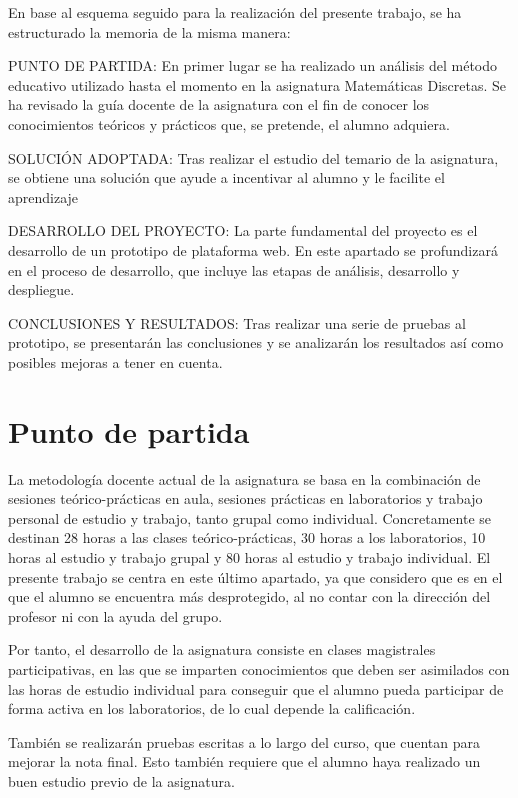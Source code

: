 \documentclass[openright,twoside,10pt]{book}
\begin{document}
    En base al esquema seguido para la realización del presente trabajo, se
    ha estructurado la memoria de la misma manera:
    
    PUNTO DE PARTIDA: En primer lugar se ha realizado un análisis del método
    educativo utilizado hasta el momento en la asignatura Matemáticas
    Discretas. Se ha revisado la guía docente de la asignatura con el fin de
    conocer los conocimientos teóricos y prácticos que, se pretende, el
    alumno adquiera.
    
    SOLUCIÓN ADOPTADA: Tras realizar el estudio del temario de la
    asignatura, se obtiene una solución que ayude a incentivar al alumno y
    le facilite el aprendizaje
    
    DESARROLLO DEL PROYECTO: La parte fundamental del proyecto es el
    desarrollo de un prototipo de plataforma web. En este apartado se
    profundizará en el proceso de desarrollo, que incluye las etapas de
    análisis, desarrollo y despliegue.
    
    CONCLUSIONES Y RESULTADOS: Tras realizar una serie de pruebas al
    prototipo, se presentarán las conclusiones y se analizarán los
    resultados así como posibles mejoras a tener en cuenta.
    
    \chapter{Punto de partida}\label{punto-de-partida}
    
    La metodología docente actual de la asignatura se basa en la combinación
    de sesiones teórico-prácticas en aula, sesiones prácticas en
    laboratorios y trabajo personal de estudio y trabajo, tanto grupal como
    individual. Concretamente se destinan 28 horas a las clases
    teórico-prácticas, 30 horas a los laboratorios, 10 horas al estudio y
    trabajo grupal y 80 horas al estudio y trabajo individual. El presente
    trabajo se centra en este último apartado, ya que considero que es en el
    que el alumno se encuentra más desprotegido, al no contar con la
    dirección del profesor ni con la ayuda del grupo.
    
    Por tanto, el desarrollo de la asignatura consiste en clases magistrales
    participativas, en las que se imparten conocimientos que deben ser
    asimilados con las horas de estudio individual para conseguir que el
    alumno pueda participar de forma activa en los laboratorios, de lo cual
    depende la calificación.
    
    También se realizarán pruebas escritas a lo largo del curso, que cuentan
    para mejorar la nota final. Esto también requiere que el alumno haya
    realizado un buen estudio previo de la asignatura.
    
\end{document}
